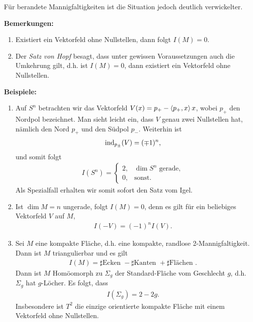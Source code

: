 \documentclass[12pt,a4paper]{article}
\def\#{\sharp}
\begin{document}
\bigskip

F\"ur berandete Mannigfaltigkeiten ist die Situation jedoch deutlich verwickelter.


\bigskip

{\bf Bemerkungen:}
\begin{enumerate}
  \item Existiert ein Vektorfeld ohne Nullstellen, dann folgt $I(M) = 0$.
  \item Der \textit{Satz von Hopf} besagt, dass unter gewissen
  Voraussetzungen auch die Umkehrung gilt, d.h. ist $I(M) = 0$, dann existiert
  ein Vektorfeld ohne Nullstellen.
\end{enumerate}

\bigskip

{\bf Beispiele:}
\begin{enumerate}
  \item 
Auf $S^n$ betrachten wir das Vektorfeld $V(x) = p_+ - \left\langle p_+,x\right\rangle x$, wobei $p_+$
den Nordpol bezeichnet. Man sieht leicht ein, dass $V$ genau zwei Nullstellen hat,
n\"amlich den Nord $p_+$ und den S\"udpol $p_-$. Weiterhin ist
\begin{align*}
\mathrm{ind}_{p_\pm}(V) = (\mp 1)^n,
\end{align*}
und somit folgt
\begin{align*}
I(S^n) = 
\begin{cases}
2, & \dim S^n\text{ gerade},\\
0, & \text{sonst}.
\end{cases}
\end{align*}
Als Spezialfall erhalten wir somit sofort den Satz vom Igel.
\item Ist $\dim M = n$ ungerade, folgt $I(M) = 0$, denn es gilt f\"ur ein
beliebiges Vektorfeld $V$ auf $M$,
\begin{align*}
I(-V) = (-1)^nI(V).
\end{align*}
\item Sei $M$ eine kompakte Fl\"ache, d.h. eine kompakte, randlose
2-Mannigfaltigkeit. Dann ist $M$ triangulierbar und es gilt
\begin{align*}
I(M) = \#\text{Ecken }  -
\#\text{Kanten }  +
\#\text{Fl\"achen }.
\end{align*}
Dann ist $M$ Hom\"oomorph zu $\Sigma_g$ der Standard-Fl\"ache vom Geschlecht $g$,
d.h. $\Sigma_g$ hat $g$-L\"ocher. Es folgt, dass
\begin{align*}
I(\Sigma_g) = 2-2g.
\end{align*}
Insbesondere ist $T^2$ die einzige orientierte kompakte Fl\"ache mit einem
Vektorfeld ohne Nullstellen.
\end{enumerate}
\end{document}
